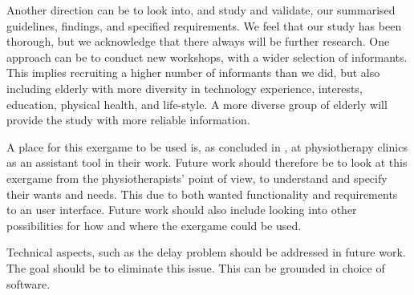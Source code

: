 Another direction can be to look into, and study and validate, our summarised guidelines, findings, and specified requirements. We feel that our study has been thorough, but we acknowledge that there always will be further research. One approach can be to conduct new workshops, with a wider selection of informants. This implies recruiting a higher number of informants than we did, but also including elderly with more diversity in technology experience, interests, education, physical health, and life-style. A more diverse group of elderly will provide the study with more reliable information.   

A place for this exergame to be used is, as concluded in \cite{project}, at physiotherapy clinics as an assistant tool in their work. Future work should therefore be to look at this exergame from the physiotherapists' point of view, to understand and specify their wants and needs. This due to both wanted functionality and requirements to an user interface. Future work should also include looking into other possibilities for how and where the exergame could be used.   

Technical aspects, such as the delay problem should be addressed in future work. The goal should be to eliminate this issue. This can be grounded in choice of software. 
